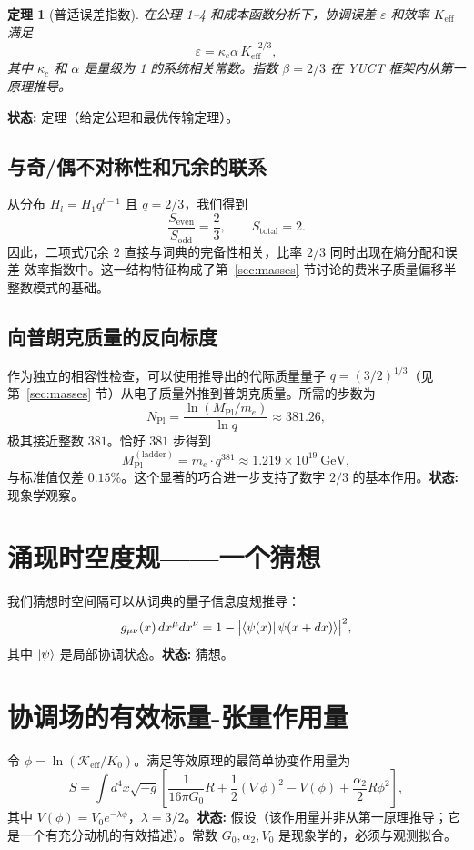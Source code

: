 \documentclass[11pt,a4paper]{article}
\newtheorem{theorem}{定理}[section]
\newcommand{\Mpl}{M_{\mathrm{Pl}}}
\begin{document}
	\begin{theorem}[普适误差指数]
		在公理 1–4 和成本函数分析下，协调误差 \(\varepsilon\) 和效率 \(K_{\mathrm{eff}}\) 满足
		\[
		\boxed{\varepsilon = \kappa_c \alpha \, K_{\mathrm{eff}}^{-2/3}},
		\]
		其中 \(\kappa_c\) 和 \(\alpha\) 是量级为 1 的系统相关常数。指数 \(\beta = 2/3\) 在 YUCT 框架内从第一原理推导。
	\end{theorem}
	\textbf{状态:} 定理（给定公理和最优传输定理）。
	
	\subsection{与奇/偶不对称性和冗余的联系}
	从分布 \(H_l = H_1 q^{l-1}\) 且 \(q=2/3\)，我们得到
	\[
	\frac{S_{\mathrm{even}}}{S_{\mathrm{odd}}} = \frac{2}{3}, \qquad S_{\mathrm{total}} = 2.
	\]
	因此，二项式冗余 \(2\) 直接与词典的完备性相关，比率 \(2/3\) 同时出现在熵分配和误差-效率指数中。这一结构特征构成了第~\ref{sec:masses} 节讨论的费米子质量偏移半整数模式的基础。
	
	\subsection{向普朗克质量的反向标度}
	作为独立的相容性检查，可以使用推导出的代际质量量子 \(q = (3/2)^{1/3}\)（见第~\ref{sec:masses} 节）从电子质量外推到普朗克质量。所需的步数为
	\[
	N_{\mathrm{Pl}} = \frac{\ln(\Mpl/m_e)}{\ln q} \approx 381.26,
	\]
	极其接近整数 \(381\)。恰好 \(381\) 步得到
	\[
	\Mpl^{\mathrm{(ladder)}} = m_e \cdot q^{381} \approx 1.219\times10^{19}\ \mathrm{GeV},
	\]
	与标准值仅差 \(0.15\%\)。这个显著的巧合进一步支持了数字 \(2/3\) 的基本作用。\textbf{状态:} 现象学观察。
	
	\section{涌现时空度规——一个猜想}
	\label{sec:metric}
	我们猜想时空间隔可以从词典的量子信息度规推导：
	\[
	g_{\mu\nu}(x) \, dx^\mu dx^\nu = 1 - \bigl| \bra{\psi(x)} \psi(x+dx) \rangle \bigr|^2,
	\]
	其中 \(\ket{\psi}\) 是局部协调状态。\textbf{状态:} 猜想。
	
	\section{协调场的有效标量-张量作用量}
	\label{sec:action}
	令 \(\phi = \ln(\mathcal{K}_{\mathrm{eff}}/K_0)\)。满足等效原理的最简单协变作用量为
	\begin{equation}
		S = \int d^4x\sqrt{-g}\left[ \frac{1}{16\pi G_0} R + \frac12(\nabla\phi)^2 - V(\phi) + \frac{\alpha_2}{2}R\phi^2 \right],
		\label{eq:action}
	\end{equation}
	其中 \(V(\phi) = V_0 e^{-\lambda\phi}\)，\(\lambda = 3/2\)。\textbf{状态:} 假设（该作用量并非从第一原理推导；它是一个有充分动机的有效描述）。常数 \(G_0, \alpha_2, V_0\) 是现象学的，必须与观测拟合。
	
\end{document}
